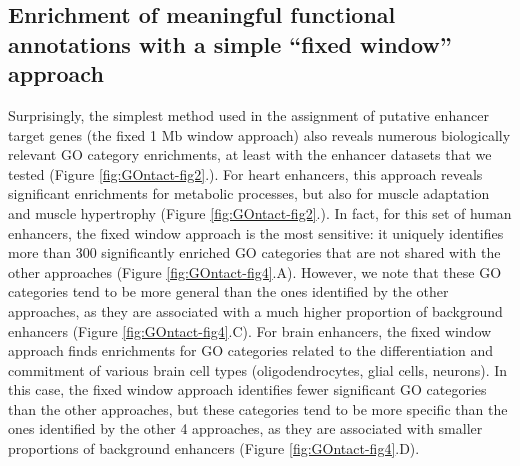 \subsection{Enrichment of meaningful functional annotations with a simple “fixed window” approach}

Surprisingly, the simplest method used in the assignment of putative enhancer target genes (the fixed 1 Mb window approach) also reveals numerous biologically relevant GO category enrichments, at least with the enhancer datasets that we tested (Figure \ref{fig:GOntact-fig2}.). For heart enhancers, this approach reveals significant enrichments for metabolic processes, but also for muscle adaptation and muscle hypertrophy (Figure \ref{fig:GOntact-fig2}.). In fact, for this set of human enhancers, the fixed window approach is the most sensitive: it uniquely identifies more than 300 significantly enriched GO categories that are not shared with the other approaches (Figure \ref{fig:GOntact-fig4}.A). However, we note that these GO categories tend to be more general than the ones identified by the other approaches, as they are associated with a much higher proportion of background enhancers (Figure \ref{fig:GOntact-fig4}.C). For brain enhancers, the fixed window approach finds enrichments for GO categories related to the differentiation and commitment of various brain cell types (oligodendrocytes, glial cells, neurons). In this case, the fixed window approach identifies fewer  significant GO categories than the other approaches, but these categories tend to be more specific than the ones identified by the other 4 approaches, as they are associated with smaller proportions of background enhancers (Figure \ref{fig:GOntact-fig4}.D).

